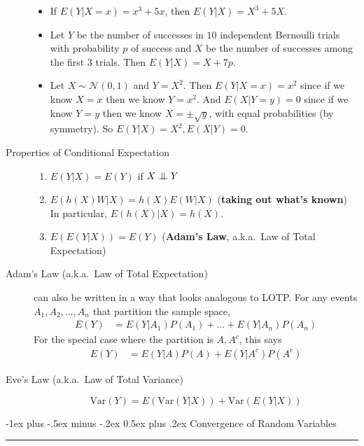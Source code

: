 \documentclass[10pt,landscape]{article}
\makeatletter
\newcommand\independent{\protect\mathpalette{\protect\independenT}{\perp}}
\def\independenT#1#2{\mathrel{\setbox0\hbox{$#1#2$}%
    \copy0\kern-\wd0\mkern4mu\box0}}
\newcommand{\var}{\textrm{Var}}
\newcommand{\N}{\mathcal{N}}
\renewcommand{\section}{\@startsection{section}{1}{0mm}%
                                {-1ex plus -.5ex minus -.2ex}%
                                {0.5ex plus .2ex}%
                                {\normalfont\large\bfseries}}
\makeatother
\begin{document}
\begin{multicols*}{3}
\begin{description}
		\begin{itemize}
			\item If $E(Y|X=x) = x^3+5x$, then $E(Y|X) = X^3 + 5X$.
			\item Let $Y$ be the number of successes in $10$ independent Bernoulli trials with probability $p$ of success and $X$ be the number of successes among the first $3$ trials. Then $E(Y|X)=X+7p$.
			\item Let $X \sim \N(0,1)$ and $Y=X^2$. Then $E(Y|X=x) = x^2$ since if we know $X=x$ then we know $Y=x^2$. And $E(X|Y=y) = 0$ since if we know $Y=y$ then we know $X = \pm \sqrt{y}$, with equal probabilities (by symmetry). So $E(Y|X)=X^2, E(X|Y)=0$.  
		\end{itemize} 
												    
		\item[Properties of Conditional Expectation] \quad
		\begin{enumerate}
			\item $E(Y|X) = E(Y)$ if $X \independent Y$
			\item $E(h(X)W|X) = h(X)E(W|X)$ (\textbf{taking out what's known}) \\
			      In particular, $E(h(X)|X) = h(X)$.
			\item $E(E(Y|X)) = E(Y)$ (\textbf{Adam's Law}, a.k.a.~Law of Total Expectation)
		\end{enumerate}
												
		\item[Adam's Law (a.k.a.~Law of Total Expectation)]  can also be written in a way that looks analogous to LOTP. For any events $A_1, A_2, \dots, A_n$ that partition the sample space, 
		\begin{align*}
			E(Y) & = E(Y|A_1)P(A_1) + \dots + E(Y|A_n)P(A_n) 
		\end{align*}
		For the special case where the partition is $A, A^c$, this says
		\begin{align*}
			E(Y) & = E(Y|A)P(A) + E(Y|A^c)P(A^c) 
		\end{align*}
												
		\item[Eve's Law (a.k.a.~Law of Total Variance)] \quad
		\[\var(Y) = E(\var(Y|X)) + \var(E(Y|X))\]
	\end{description}

	\hypertarget{convergence-of-random-variables}{%
		\section{Convergence of Random
		 Variables}\label{convergence-of-random-variables}}\smallskip \hrule height 2pt \smallskip
									

\end{multicols*}
\end{document}
